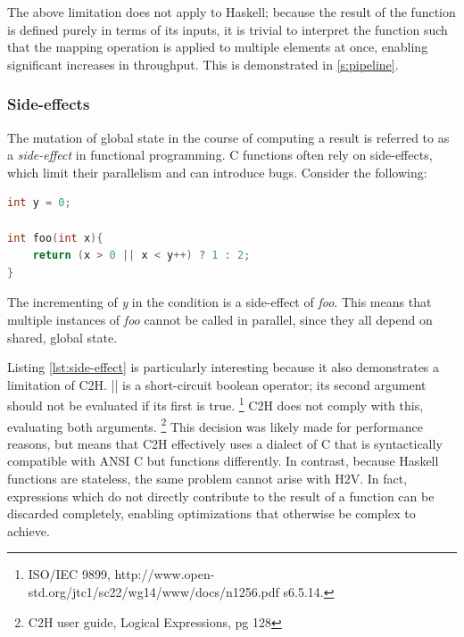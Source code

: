 \documentclass[english,onecolumn]{article}
\begin{document}
The above limitation does not apply to Haskell; because the result of the function is defined purely in terms of its inputs, it is trivial to interpret the function such that the mapping operation is applied to multiple elements at once, enabling significant increases in throughput.
This is demonstrated in \ref{s:pipeline}.

\subsubsection{Side-effects}
The mutation of global state in the course of computing a result is referred to as a \textit{side-effect} in functional programming. C functions often rely on side-effects, which limit their parallelism and can introduce bugs. Consider the following:
\begin{lstlisting}[language=C, label={lst:side-effect}]
int y = 0;

int foo(int x){
    return (x > 0 || x < y++) ? 1 : 2;
}
\end{lstlisting}

The incrementing of \textit{y} in the condition is a side-effect of \textit{foo}. This means that multiple instances of \textit{foo} cannot be called in parallel, since they all depend on shared, global state.

Listing \ref{lst:side-effect} is particularly interesting because it also demonstrates a limitation of C2H. || is a short-circuit boolean operator; its second argument should not be evaluated if its first is true.%
\footnote{ISO/IEC 9899, http://www.open-std.org/jtc1/sc22/wg14/www/docs/n1256.pdf s6.5.14.}
C2H does not comply with this, evaluating both arguments.%
\footnote{C2H user guide, Logical Expressions, pg 128}
This decision was likely made for performance reasons, but means that C2H effectively uses a dialect of C that is syntactically compatible with ANSI C but functions differently.
In contrast, because Haskell functions are stateless, the same problem cannot arise with H2V. In fact, expressions which do not directly contribute to the result of a function can be discarded completely, enabling optimizations that otherwise be complex to achieve.
\end{document}
